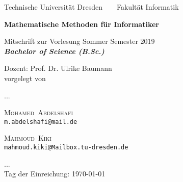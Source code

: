 \documentclass[a4paper,12pt]{report}
\makeatletter
\newcommand{\nameE}{Abdelshafi}
\newcommand{\vornameE}{Mohamed}
\newcommand{\emailE}{m.abdelshafi@mail.de}
\newcommand{\nameS}{Kiki}
\newcommand{\vornameS}{Mahmoud}
\newcommand{\emailS}{mahmoud.kiki@Mailbox.tu-dresden.de}
\theoremstyle{plain} %
\theoremstyle{break}
\newcommand{\thema}{Mathematische Methoden für Informatiker}
\newcommand{\datum}{\today}%
\makeatother
\begin{document}




	\thispagestyle{empty}


    \begin{center}
    {\Large
    Technische Universit\"{a}t Dresden\  \ \textbullet\ \ Fakult\"{a}t Informatik
    }

        \vfil

        {\bfseries\Huge\thema}

        \vfil

        {\LARGE
Mitschrift zur Vorlesung Sommer Semester 2019  \\[\bigskipamount]

        \bfseries{\itshape Bachelor of Science  \textup{(}B.Sc.\textup{)}}\\[\bigskipamount]
        }%

        \vfil\vfil\vfil
        Dozent: Prof. Dr. Ulrike Baumann \\
        vorgelegt von\\
        \item ... \\
        \item \textsc{\vornameE\ \nameE } \\ \texttt{\emailE} \\  \item
        \textsc{\vornameS\ \nameS \qquad } \\ \texttt{\emailS}  \\
        \item ... \\
        Tag der Einreichung: \datum\\[\bigskipamount]

    \end{center}


    \cleardoublepage



    \tableofcontents

    \thispagestyle{empty}



    \setcounter{page}{0}
\end{document}
